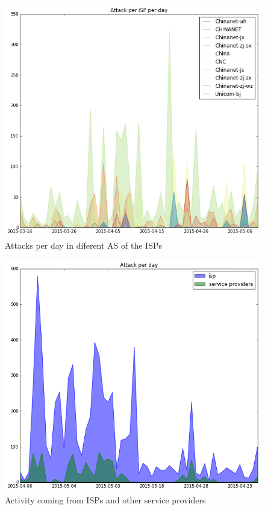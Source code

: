 \begin{figure}[h]
     \caption{Attacks per day in diferent AS of the ISPs }
     \label{fig:isp_day}
    \centering
    \includegraphics[width=\linewidth]{images/isp_legend_area}
\end{figure}


\begin{figure}[h]
    \caption{Activity coming from ISPs and other service providers}
    \label{fig:as_day}
    \centering
    \includegraphics[width=\linewidth]{images/isp_no_isp_area}
\end{figure}
